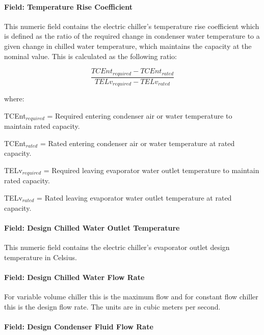 \paragraph{Field: Temperature Rise Coefficient}\label{field-temperature-rise-coefficient}

This numeric field contains the electric chiller's temperature rise coefficient which is defined as the ratio of the required change in condenser water temperature to a given change in chilled water temperature, which maintains the capacity at the nominal value. This is calculated as the following ratio:

\begin{equation}
\frac{{TCEn{t_{required}} - TCEn{t_{rated}}}}{{TEL{v_{required}} - TEL{v_{rated}}}}
\end{equation}

where:

TCEnt\(_{required}\) = Required entering condenser air or water temperature to maintain rated capacity.

TCEnt\(_{rated}\) = Rated entering condenser air or water temperature at rated capacity.

TELv\(_{required}\) = Required leaving evaporator water outlet temperature to maintain rated capacity.

TELv\(_{rated}\) = Rated leaving evaporator water outlet temperature at rated capacity.

\paragraph{Field: Design Chilled Water Outlet Temperature}\label{field-design-chilled-water-outlet-temperature}

This numeric field contains the electric chiller's evaporator outlet design temperature in Celsius.

\paragraph{Field: Design Chilled Water Flow Rate}\label{field-design-chilled-water-flow-rate-3}

For variable volume chiller this is the maximum flow and for constant flow chiller this is the design flow rate. The units are in cubic meters per second.

\paragraph{Field: Design Condenser Fluid Flow Rate}\label{field-design-condenser-fluid-flow-rate}


